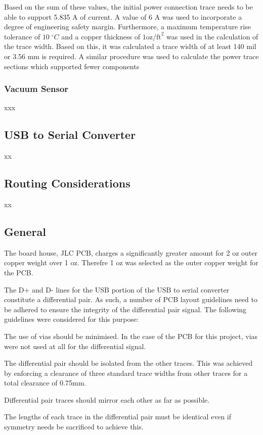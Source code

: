 Based on the sum of these values, the initial power connection trace needs to be able to support 5.835 A of current. A value of 6 A was used to incorporate a degree of engineering safety margin. Furthermore, a maximum temperature rise tolerance of $10\;^{\circ}C$ and a copper thickness of $1 \text{oz/ft}^2$ was used in the calculation of the trace width. Based on this, it was calculated a trace width of at least 140 mil or 3.56 mm is required. A similar procedure was used to calculate the power trace sections which supported fewer components

\subsubsection{Vacuum Sensor}
xxx


\subsection{USB to Serial Converter}

xx

\subsection{Routing Considerations}

xx

\subsection{General}

\begin{compactitem}
	\item The board house, JLC PCB, charges a significantly greater amount for 2 oz outer copper weight over 1 oz. Therefre 1 oz was selected as the outer copper weight for the PCB.
\end{compactitem}

The D+ and D- lines for the USB portion of the USB to serial converter constitute a differential pair. As such, a number of \ac{PCB} layout guidelines need to be adhered to ensure the integrity of the differential pair signal. The following guidelines were considered for this purpose:

\begin{compactitem}
	\item The use of vias should be minimised. In the case of the PCB for this project, vias were not used at all for the differential signal.
	\item The differential pair should be isolated from the other traces. This was achieved by enforcing a clearance of three standard trace widths from other traces for a total clearance of 0.75mm.
	\item Differential pair traces should mirror each other as far as possible.
	\item The lengths of each trace in the differential pair must be identical even if symmetry needs be sacrificed to achieve this.
\end{compactitem}

